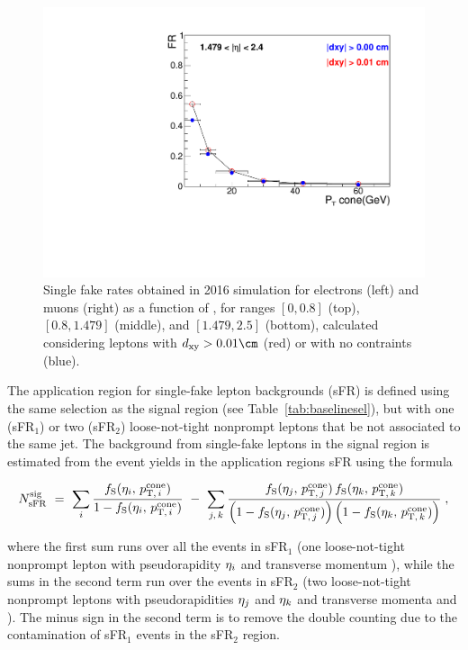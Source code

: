 \begin{figure}[t!]
  \hfill{}
  \includegraphics[width=.48\textwidth]{Figures/c6/backgrounds/FR/sFR/QCD/eta3_mu_dxy_comparison.pdf}
  \caption{Single fake rates obtained in 2016 simulation for electrons
    (left) and muons (right) as
    a function of \ptc, for \abseta ranges $[0,0.8]$ (top),
    $[0.8,1.479]$ (middle), and $[1.479,2.5]$ (bottom), calculated considering leptons with
    $\dxy> 0.01\cm$ (red) or with no \dxy contraints (blue).}
  \label{fig:sFR_dxy_comparison}
\end{figure}

The application region for single-fake lepton backgrounds (sFR)
is defined using the same selection as the signal region (see
Table~\ref{tab:baselinesel}), but with one (sFR$_1$) or two (sFR$_2$)
loose-not-tight nonprompt leptons that be not associated to the same
jet.
The background from single-fake leptons in the signal region is
estimated from the event yields in the application regions sFR using
the formula
\begin{linenomath}
  \begin{equation}
    \label{eq:sFRbkg}
    N_{\mathrm{sFR}}^{\mathrm{sig}} ~=~ 
    \sum_i\frac{f_{\mathrm{S}}(\eta_i,\,p_{\mathrm{T,\,}i}^{\mathrm{cone}})}{1-f_{\mathrm{S}}(\eta_i,\,p_{\mathrm{T,\,}i}^{\mathrm{cone}})}
    ~-~ 
    \sum_{j,\,k}\frac{f_{\mathrm{S}}(\eta_j,\,p_{\mathrm{T,\,}j}^{\mathrm{cone}})\,f_{\mathrm{S}}(\eta_k,\,p_{\mathrm{T,\,}k}^{\mathrm{cone}})}{\left(1-f_{\mathrm{S}}(\eta_j,\,p_{\mathrm{T,\,}j}^{\mathrm{cone}})\right)\left(1-f_{\mathrm{S}}(\eta_k,\,p_{\mathrm{T,\,}k}^{\mathrm{cone}})\right)}\;,
  \end{equation}
\end{linenomath}
where the first sum runs over all the events in sFR$_1$
(one loose-not-tight nonprompt lepton with pseudorapidity $\eta_i$
and transverse momentum ),
while the sums in the second term run over the events in sFR$_2$
(two loose-not-tight nonprompt leptons with pseudorapidities
$\eta_j$ and $\eta_k$ and transverse momenta  and
).
The minus sign in the second term is to remove the double counting due
to the contamination of sFR$_1$ events in the sFR$_2$ region.